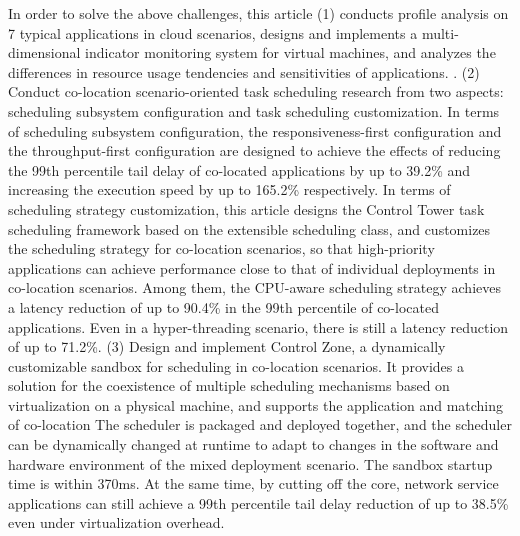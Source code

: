 In order to solve the above challenges, this article (1) conducts profile analysis on 7 typical applications in cloud scenarios, designs and implements a multi-dimensional indicator monitoring system for virtual machines, and analyzes the differences in resource usage tendencies and sensitivities of applications. . (2) Conduct co-location scenario-oriented task scheduling research from two aspects: scheduling subsystem configuration and task scheduling customization. In terms of scheduling subsystem configuration, the responsiveness-first configuration and the throughput-first configuration are designed to achieve the effects of reducing the 99th percentile tail delay of co-located applications by up to 39.2\% and increasing the execution speed by up to 165.2\% respectively. In terms of scheduling strategy customization, this article designs the Control Tower task scheduling framework based on the extensible scheduling class, and customizes the scheduling strategy for co-location scenarios, so that high-priority applications can achieve performance close to that of individual deployments in co-location scenarios. Among them, the CPU-aware scheduling strategy achieves a latency reduction of up to 90.4\% in the 99th percentile of co-located applications. Even in a hyper-threading scenario, there is still a latency reduction of up to 71.2\%. (3) Design and implement Control Zone, a dynamically customizable sandbox for scheduling in co-location scenarios. It provides a solution for the coexistence of multiple scheduling mechanisms based on virtualization on a physical machine, and supports the application and matching of co-location The scheduler is packaged and deployed together, and the scheduler can be dynamically changed at runtime to adapt to changes in the software and hardware environment of the mixed deployment scenario. The sandbox startup time is within 370ms. At the same time, by cutting off the core, network service applications can still achieve a 99th percentile tail delay reduction of up to 38.5\% even under virtualization overhead.



\pagestyle{enfrontmatterstyle}%
\cleardoublepage\pagestyle{frontmatterstyle}%

